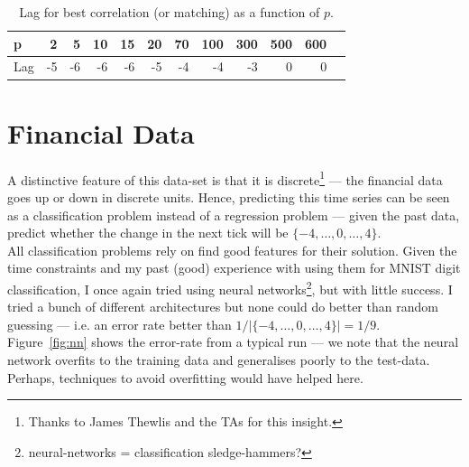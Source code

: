 \documentclass[11pt]{report}
\begin{document}
\begin{table}[htp]
\begin{center}
\begin{tabular}{|l||r|r|r|r|r|r|r|r|r|r|r|}
\hline
p      & 2 & 5 & 10 & 15 & 20 & 70 & 100 & 300 & 500 & 600\\\hline
Lag  & -5 &  -6 & -6 & -6 & -5 & -4 & -4 & -3 & 0 & 0 \\\hline
\end{tabular}
\caption{Lag for best correlation (or matching) as a function of $p$.}
\label{tab1}
\end{center}
\end{table}

\section*{Financial Data}
A distinctive feature of this data-set is that it is discrete\footnote{Thanks to James Thewlis and the TAs for this insight.} --- the financial data goes up or down in discrete units. Hence, predicting this time series can be seen as a classification problem instead of a regression problem --- given the past data, predict whether the change in the next tick will be $\{-4,\hdots,0,\hdots,4\}$.\\

All classification problems rely on find good features for their solution. Given the time constraints and my past (good) experience with using them for MNIST digit classification, I once again tried using neural networks\footnote{neural-networks = classification sledge-hammers?}, but with little success. I tried a bunch of different architectures but none could do better than random guessing --- i.e. an error rate better than $1/|\{-4,\hdots,0,\hdots,4\}| = 1/9$. Figure~\ref{fig:nn} shows the error-rate from a typical run --- we note that the neural network overfits to the training data and generalises poorly to the test-data. Perhaps, techniques to avoid overfitting would have helped here.
\end{document}
